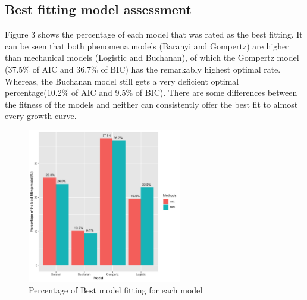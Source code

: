 \documentclass[11pt]{article}
\begin{document}
\subsection{Best fitting model assessment}
Figure 3 shows the percentage of each model that was rated as the best fitting. It can be seen that both phenomena models (Baranyi and Gompertz) are higher than mechanical models (Logistic and Buchanan), of which the Gompertz model (37.5\% of AIC and 36.7\% of BIC) has the remarkably highest optimal rate. Whereas, the Buchanan model still gets a very deficient optimal percentage(10.2\% of AIC and 9.5\% of BIC). There are some differences between the fitness of the models and neither can consistently offer the best fit to almost every growth curve.
\begin{figure}[htpb]
\centering
\includegraphics[width = 0.6\textwidth]{../Results/Bestfitting.png}
        \caption{Percentage of Best model fitting for each model}
	    \end{figure}
\end{document}
